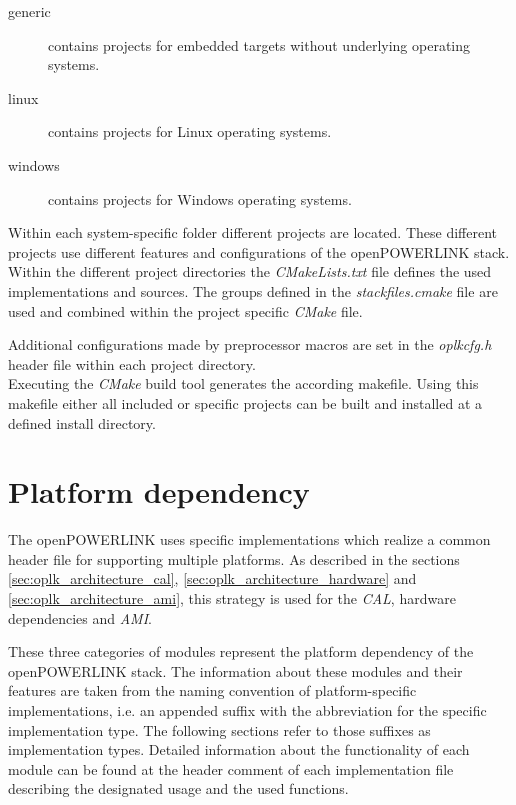 \begin{description}
    \item[generic] contains projects for embedded targets without underlying operating systems.
    \item[linux] contains projects for Linux operating systems.
    \item[windows] contains projects for Windows operating systems.
\end{description}
\begin{sloppypar}
Within each system-specific folder different projects are located.
These different projects use different features and configurations of the openPOWERLINK stack.
Within the different project directories the \emph{CMakeLists.txt} file defines the used implementations and sources.
The groups defined in the \emph{stackfiles.cmake} file are used and combined within the project specific \emph{CMake} file.
\end{sloppypar}

Additional configurations made by preprocessor macros are set in the \emph{oplkcfg.h} header file within each project directory.
\\

Executing the \emph{CMake} build tool generates the according makefile.
Using this makefile either all included or specific projects can be built and installed at a defined install directory. \cite[Building Stack Libraries]{openpowerlink_doc}

\section{Platform dependency}
\label{sec:oplk_platform}

The openPOWERLINK uses specific implementations which realize a common header file for supporting multiple platforms.
As described in the sections \ref{sec:oplk_architecture_cal}, \ref{sec:oplk_architecture_hardware} and \ref{sec:oplk_architecture_ami}, this strategy is used for the \emph{CAL}, hardware dependencies and \emph{AMI}.

These three categories of modules represent the platform dependency of the openPOWERLINK stack.
The information about these modules and their features are taken from the naming convention of platform-specific implementations, i.e. an appended suffix with the abbreviation for the specific implementation type.
The following sections refer to those suffixes as implementation types.
Detailed information about the functionality of each module can be found at the header comment of each implementation file describing the designated usage and the used functions.

